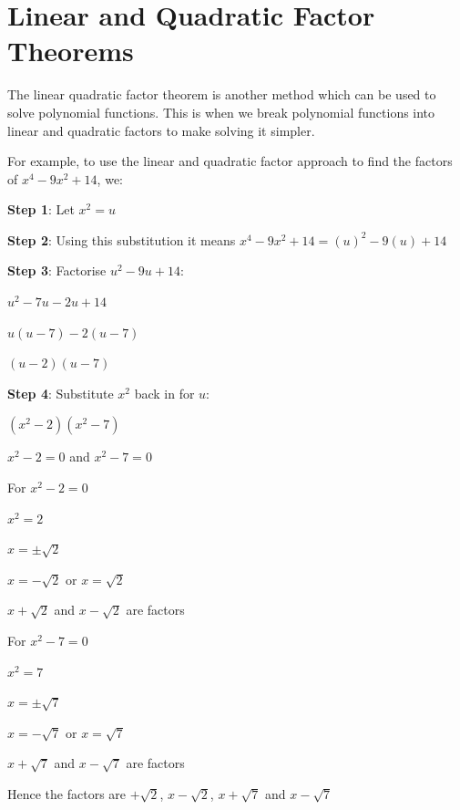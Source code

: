 \section{Linear and Quadratic Factor Theorems}

The linear quadratic factor theorem is another method which can be used to solve
polynomial functions. This is when we break polynomial functions into linear and
quadratic factors to make solving it simpler.

For example, to use the linear and quadratic factor approach to find the factors of
$x^4 - 9x^2 + 14$, we:

\textbf{Step 1}: Let $x^2 = u$

\textbf{Step 2}: Using this substitution it means $x^4 - 9x^2 + 14 = (u)^2 - 9(u) + 14$

\textbf{Step 3}: Factorise $u^2 - 9u + 14$:

$u^2 - 7u - 2u + 14$

$u(u - 7) - 2(u - 7)$

$(u - 2)(u - 7)$

\textbf{Step 4}: Substitute $x^2$ back in for $u$:

$(x^2 - 2)(x^2 - 7)$

$x^2 - 2 = 0$ and $x^2 - 7 = 0$

For $x^2 - 2 = 0$

$x^2 = 2$

$x = \pm\sqrt{2}$

$x = -\sqrt{2}$ or $x = \sqrt{2}$

$x + \sqrt{2}$ and $x - \sqrt{2}$ are factors

For $x^2 - 7 = 0$

$x^2 = 7$

$x = \pm\sqrt{7}$

$x = -\sqrt{7}$ or $x = \sqrt{7}$

$x + \sqrt{7}$ and $x - \sqrt{7}$ are factors

Hence the factors are $+\sqrt{2}$, $x - \sqrt{2}$, $x + \sqrt{7}$ and $x - \sqrt{7}$

